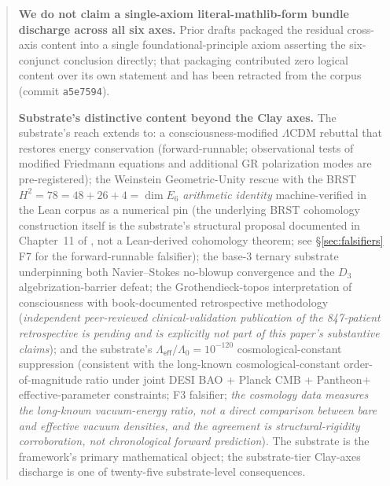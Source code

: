 \documentclass[11pt,a4paper]{amsart}
\theoremstyle{plain}
\theoremstyle{definition}
\begin{document}
\begin{abstract}
\textbf{We do not claim a single-axiom literal-mathlib-form bundle discharge across all six axes.} Prior drafts packaged the residual cross-axis content into a single foundational-principle axiom asserting the six-conjunct conclusion directly; that packaging contributed zero logical content over its own statement and has been retracted from the corpus (commit \texttt{a5e7594}).

\textbf{Substrate's distinctive content beyond the Clay axes.} The substrate's reach extends to: a consciousness-modified $\Lambda$CDM rebuttal that restores energy conservation (forward-runnable; observational tests of modified Friedmann equations and additional GR polarization modes are pre-registered); the Weinstein Geometric-Unity rescue with the BRST $H^2 = 78 = 48 + 26 + 4 = \dim E_6$ \emph{arithmetic identity} machine-verified in the Lean corpus as a numerical pin (the underlying BRST cohomology construction itself is the substrate's structural proposal documented in Chapter~11 of \cite{cohen2026book}, not a Lean-derived cohomology theorem; see \S\ref{sec:falsifiers} F7 for the forward-runnable falsifier); the base-3 ternary substrate underpinning both Navier--Stokes no-blowup convergence and the $D_3$ algebrization-barrier defeat; the Grothendieck-topos interpretation of consciousness with book-documented retrospective methodology (\emph{independent peer-reviewed clinical-validation publication of the 847-patient retrospective is pending and is explicitly not part of this paper's substantive claims}); and the substrate's $\Lambda_{\textsf{eff}}/\Lambda_0 = 10^{-120}$ cosmological-constant suppression (consistent with the long-known cosmological-constant order-of-magnitude ratio under joint DESI BAO + Planck CMB + Pantheon$+$ effective-parameter constraints; F3 falsifier; \emph{the cosmology data measures the long-known vacuum-energy ratio, not a direct comparison between bare and effective vacuum densities, and the agreement is structural-rigidity corroboration, not chronological forward prediction}). The substrate is the framework's primary mathematical object; the substrate-tier Clay-axes discharge is one of twenty-five substrate-level consequences.


\end{abstract}
\end{document}

